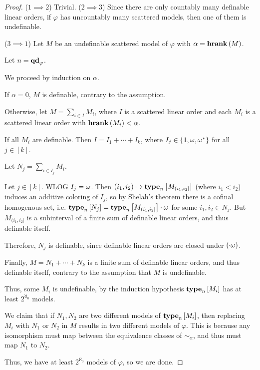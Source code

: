 \begin{proof}
    ($1 \implies 2$) Trivial.
    ($2 \implies 3$) Since there are only countably many
    definable linear orders,
    if $\varphi$ has uncountably many scattered models,
    then one of them is undefinable.

    ($3 \implies 1$)
    Let $M$ be an undefinable scattered model of $\varphi$
    with $\alpha = \mathbf{hrank} \left( {M} \right)$.

    Let $n = \mathbf{qd}_{\varphi}$.

    We proceed by induction on $\alpha$.

    If $\alpha = 0$, $M$ is definable, contrary to the assumption.

    Otherwise, let $M = \sum_{i \in I} M_i$,
    where $I$ is a scattered linear order
    and each $M_i$ is a scattered linear order with $\mathbf{hrank} \left( {M_i} \right) < \alpha$.

    If all $M_i$ are definable. Then $I = I_1 + \cdots + I_k$,
    where $I_j \in \left\{ {1, \omega, \omega^\ast} \right\}$ for all $j \in [k]$.

    Let $N_j = \sum_{i \in I_j} M_i$.

    Let $j \in [k]$. WLOG $I_j = \omega$.
    Then $(i_1, i_2) \mapsto \mathbf{type}_{n} \left[ {M_{(i_1, i_2]}} \right]$ (where $i_1 < i_2$)
    induces an additive coloring of $I_j$, so by Shelah's theorem
    there is a cofinal homogenous set,
    i.e. $\mathbf{type}_{n} \left[ {N_j} \right] = \mathbf{type}_{n} \left[ {M_{(i_1, i_2]}} \right] \cdot \omega$ for some
    $i_1, i_2 \in N_j$. But $M_{(i_1, i_2]}$ is a subinterval
    of a finite sum of definable linear orders,
    and thus definable itself.

    Therefore, $N_j$ is definable, since
    definable linear orders are closed under $(\cdot \omega)$.

    Finally, $M = N_1 + \cdots + N_k$ is a finite sum of definable linear orders,
    and thus definable itself, contrary to the assumption that $M$ is undefinable.

    Thus, some $M_i$ is undefinable, by the induction
    hypothesis $\mathbf{type}_{n} \left[ {M_i} \right]$ has at least
    $2^{\aleph_0}$ models.

    We claim that if $N_1, N_2$ are two different models of $\mathbf{type}_{n} \left[ {M_i} \right]$,
    then replacing $M_i$ with $N_1$ or $N_2$ in $M$
    results in two different models of $\varphi$.
    This is because any isomorphism must map
    between the equivalence classes of $\sim_{\alpha}$,
    and thus must map $N_1$ to $N_2$.

    Thus, we have at least $2^{\aleph_0}$ models of $\varphi$,
    so we are done.
\end{proof}

